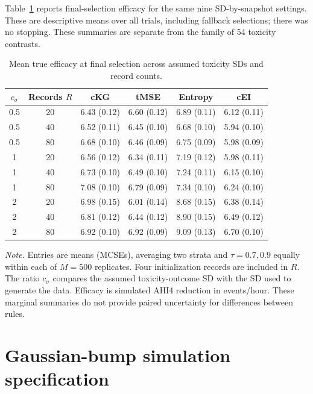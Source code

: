 \documentclass[11pt]{article}
\newcommand{\rev}[1]{{#1}}
\newcommand{\revisioncolor}{}
\begin{document}
\rev{Table~\ref{tab:nested_efficacy} reports final-selection efficacy for the same nine SD-by-snapshot settings. These are descriptive means over all trials, including fallback selections; there was no stopping. These summaries are separate from the family of 54 toxicity contrasts.}

\begin{table}[H]
\revisioncolor
\centering\footnotesize
\caption{Mean true efficacy at final selection across assumed toxicity SDs and record counts.}
\label{tab:nested_efficacy}
\begin{tabular}{@{}cccccc@{}}
\toprule
$c_\sigma$ & Records $R$ & cKG & tMSE & Entropy & cEI\\
\midrule
0.5 & 20 & 6.43 (0.12) & 6.60 (0.12) & 6.89 (0.11) & 6.12 (0.11) \\
0.5 & 40 & 6.52 (0.11) & 6.45 (0.10) & 6.68 (0.10) & 5.94 (0.10) \\
0.5 & 80 & 6.68 (0.10) & 6.46 (0.09) & 6.75 (0.09) & 5.98 (0.09) \\
1 & 20 & 6.56 (0.12) & 6.34 (0.11) & 7.19 (0.12) & 5.98 (0.11) \\
1 & 40 & 6.73 (0.10) & 6.49 (0.10) & 7.24 (0.11) & 6.15 (0.10) \\
1 & 80 & 7.08 (0.10) & 6.79 (0.09) & 7.34 (0.10) & 6.24 (0.10) \\
2 & 20 & 6.98 (0.15) & 6.01 (0.14) & 8.68 (0.15) & 6.38 (0.14) \\
2 & 40 & 6.81 (0.12) & 6.44 (0.12) & 8.90 (0.15) & 6.49 (0.12) \\
2 & 80 & 6.92 (0.10) & 6.92 (0.09) & 9.09 (0.13) & 6.70 (0.10) \\
\bottomrule
\end{tabular}
\vspace{3pt}
\begin{minipage}{0.98\linewidth}\scriptsize\raggedright
\textit{Note.} Entries are means (MCSEs), averaging two strata and $\tau=0.7,0.9$ equally within each of $M=500$ replicates. Four initialization records are included in $R$. The ratio $c_\sigma$ compares the assumed toxicity-outcome SD with the SD used to generate the data. \rev{Efficacy is simulated AHI4 reduction in events/hour.} These marginal summaries do not provide paired uncertainty for differences between rules.
\end{minipage}
\end{table}

\section{Gaussian-bump simulation specification}\label{sec:demo}
\end{document}
